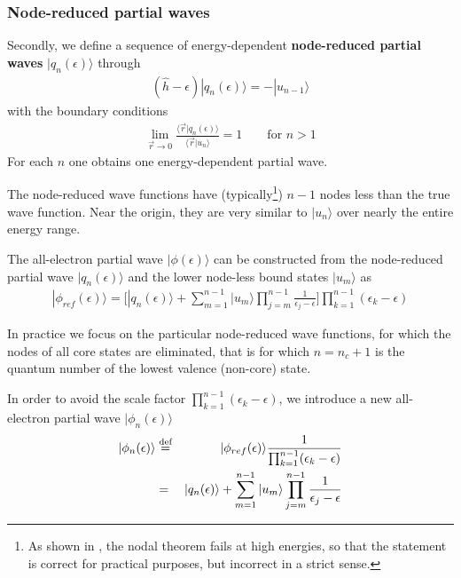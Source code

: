 \documentclass[11pt,a4paper]{report}
\begin{document}
\subsubsection{Node-reduced partial waves}
Secondly, we define \cite{bloechl12_arxiv1210_5937} a sequence of
energy-dependent \textbf{node-reduced partial waves}
 $|q_n(\epsilon)\rangle$ through
\begin{eqnarray}
(\hat{h}-\epsilon)|q_n(\epsilon)\rangle=-|u_{n-1}\rangle
\label{eq:defnodereducedpartialwave}
\end{eqnarray}
with the boundary conditions
\begin{eqnarray}
\lim_{\vec{r}\rightarrow0}
\frac{\langle\vec{r}|q_n(\epsilon)\rangle}
{\langle\vec{r}|u_n\rangle}=1
\qquad\text{for $n>1$}
\end{eqnarray}
For each $n$ one obtains one energy-dependent partial wave.


The node-reduced wave functions have (typically\footnote{As shown in
  \cite{bloechl12_arxiv1210_5937}, the nodal theorem fails at high
  energies, so that the statement is correct for practical purposes,
  but incorrect in a strict sense.}) $n-1$ nodes less than the true
wave function. Near the origin, they are very similar to $|u_n\rangle$
over nearly the entire energy range.

The all-electron partial wave $|\phi(\epsilon)\rangle$ can be
constructed from the node-reduced partial wave $|q_n(\epsilon)\rangle$
and the lower node-less bound states $|u_m\rangle$
as\cite{bloechl12_arxiv1210_5937}
\begin{eqnarray}
|\phi_{ref}(\epsilon)\rangle=\biggl[|q_n(\epsilon)\rangle
+\sum_{m=1}^{n-1}|u_m\rangle\prod_{j=m}^{n-1}\frac{1}{\epsilon_j-\epsilon}
\biggr]
\prod_{k=1}^{n-1}(\epsilon_k-\epsilon)
\label{eq:aephireffromnodereduced}
\end{eqnarray}

In practice we focus on the particular node-reduced wave functions,
for which the nodes of all core states are eliminated, that is for
which $n=n_c+1$ is the quantum number of the lowest valence (non-core)
state.

In order to avoid the scale factor
$\prod_{k=1}^{n-1}(\epsilon_k-\epsilon)$, we introduce a new
all-electron partial wave $|\phi_n(\epsilon)\rangle$
\begin{eqnarray}
|\phi_n(\epsilon)\rangle&\stackrel{\text{def}}{=}&
|\phi_{ref}(\epsilon)\rangle\frac{1}{\prod_{k=1}^{n-1}(\epsilon_k-\epsilon)}
\nonumber\\
&=&|q_n(\epsilon)\rangle
+\sum_{m=1}^{n-1}|u_m\rangle\prod_{j=m}^{n-1}\frac{1}{\epsilon_j-\epsilon}
\label{eq:aephifromnodereduced}
\end{eqnarray}
\end{document}
